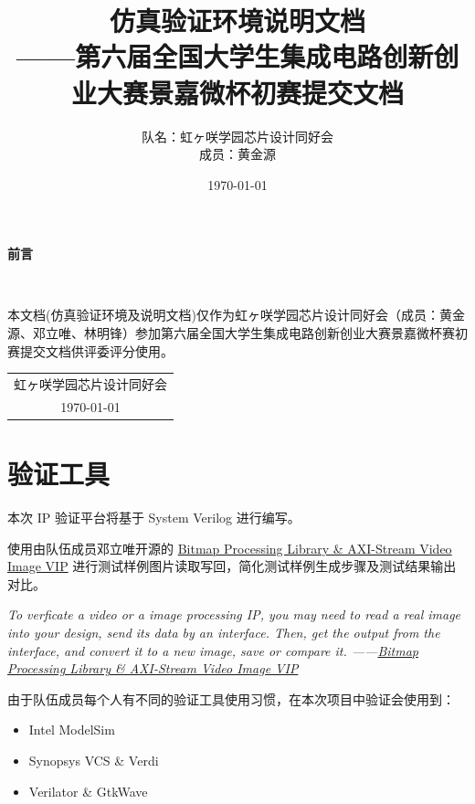 \documentclass[12pt, a4paper, oneside]{ctexbook}
\title{{\Huge{\textbf{仿真验证环境说明文档}}}\normalsize{\\——第六届全国大学生集成电路创新创业大赛景嘉微杯初赛提交文档}}
\author{队名：虹ヶ咲学园芯片设计同好会\\ 成员：黄金源\space邓立唯\space林明锋}
\date{\today}
\begin{document}
	
	\maketitle	
	\setcounter{page}{1}
	\begin{center}
		\Huge\textbf{前言}
	\end{center}~\
	
	本文档(仿真验证环境及说明文档)仅作为虹ヶ咲学园芯片设计同好会（成员：黄金源、邓立唯、林明锋）参加第六届全国大学生集成电路创新创业大赛景嘉微杯赛初赛提交文档供评委评分使用。
	~\\
	\begin{flushright}
		\begin{tabular}{c}
			虹ヶ咲学园芯片设计同好会\\
			\today
		\end{tabular}
	\end{flushright}
	\newpage
	\setcounter{page}{1}
	\tableofcontents
	\newpage
	\setcounter{page}{1}
	
	\chapter{验证工具}
	本次 IP 验证平台将基于 System Verilog 进行编写。\par 使用由队伍成员邓立唯开源的 \href{https://github.com/Aperture-Electronic/SystemVerilog-Bitmap-Library-AXI-Image-VIP}{Bitmap Processing Library \& AXI-Stream Video Image VIP} 进行测试样例图片读取写回，简化测试样例生成步骤及测试结果输出对比。\par \par
	\emph{To verficate a video or a image processing IP, you may need to read a real image into your design, send its data by an interface. Then, get the output from the interface, and convert it to a new image, save or compare it. ——\href{https://github.com/Aperture-Electronic/SystemVerilog-Bitmap-Library-AXI-Image-VIP}{Bitmap Processing Library \& AXI-Stream Video Image VIP}}
	\par \par 由于队伍成员每个人有不同的验证工具使用习惯，在本次项目中验证会使用到：
	\begin{itemize}
		\item Intel ModelSim
		\item Synopsys VCS \& Verdi
		\item Verilator \& GtkWave
	\end{itemize}
\end{document}
